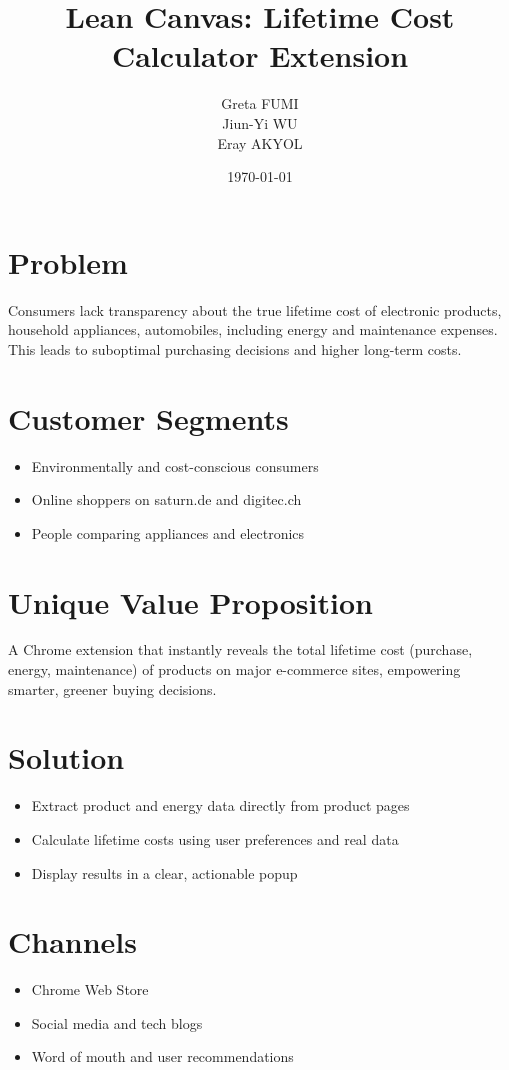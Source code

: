 \documentclass{article}
\title{Lean Canvas: Lifetime Cost Calculator Extension}
\author{Greta FUMI \\ Jiun-Yi WU \\ Eray AKYOL}
\date{\today}
\begin{document}
\maketitle

\section*{Problem}
Consumers lack transparency about the true lifetime cost of electronic products, household appliances, automobiles, including energy and maintenance expenses. This leads to suboptimal purchasing decisions and higher long-term costs.

\section*{Customer Segments}
\begin{itemize}
  \item Environmentally and cost-conscious consumers
  \item Online shoppers on saturn.de and digitec.ch
  \item People comparing appliances and electronics
\end{itemize}

\section*{Unique Value Proposition}
A Chrome extension that instantly reveals the total lifetime cost (purchase, energy, maintenance) of products on major e-commerce sites, empowering smarter, greener buying decisions.

\section*{Solution}
\begin{itemize}
  \item Extract product and energy data directly from product pages
  \item Calculate lifetime costs using user preferences and real data
  \item Display results in a clear, actionable popup
\end{itemize}

\section*{Channels}
\begin{itemize}
  \item Chrome Web Store
  \item Social media and tech blogs
  \item Word of mouth and user recommendations
\end{itemize}
\end{document}

